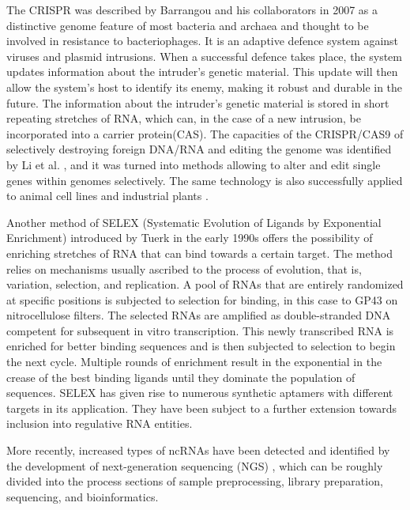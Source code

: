The CRISPR \cite{barrangou2007crispr} was described by Barrangou and his collaborators in 2007 as a distinctive genome feature of most bacteria and archaea and thought to be involved in resistance to bacteriophages. It is an adaptive defence system against viruses and plasmid intrusions. When a successful defence takes place, the system updates information about the intruder's genetic material. This update will then allow the system's host to identify its enemy, making it robust and durable in the future. The information about the intruder's genetic material is stored in short repeating stretches of RNA, which can, in the case of a new intrusion, be incorporated into a carrier protein(CAS). The capacities of the  CRISPR/CAS9 of selectively destroying foreign DNA/RNA and editing the genome was identified by Li et al. \cite{li2016harnessing}, and it was turned into methods allowing to alter and edit single genes within genomes selectively. The same technology is also successfully applied to animal cell lines \cite{hwang2013efficient, jinek2013rna, wang2013one} and industrial plants \cite{svitashev2015targeted,li2015cas9}. 

Another method of SELEX (Systematic Evolution of Ligands by Exponential Enrichment) \cite{tuerk1990systematic} introduced by Tuerk in the early 1990s offers the possibility of enriching stretches of RNA that can bind towards a certain target. The method relies on mechanisms usually ascribed to the process of evolution, that is, variation, selection, and replication. A pool of RNAs that are entirely randomized at specific positions is subjected to selection for binding, in this case to GP43 on nitrocellulose filters. The selected RNAs are amplified as double-stranded DNA competent for subsequent in vitro transcription. This newly transcribed RNA is enriched for better binding sequences and is then subjected to selection to begin the next cycle. Multiple rounds of enrichment result in the exponential in the crease of the best binding ligands until they dominate the population of sequences. SELEX has given rise to numerous synthetic aptamers with different targets in its application. They have been subject to a further extension towards inclusion into regulative RNA entities.

More recently, increased types of ncRNAs have been detected and identified by the development of next-generation sequencing (NGS) \cite{wang2009rna}, which can be roughly divided into the process sections of sample preprocessing, library preparation, sequencing, and bioinformatics. 


